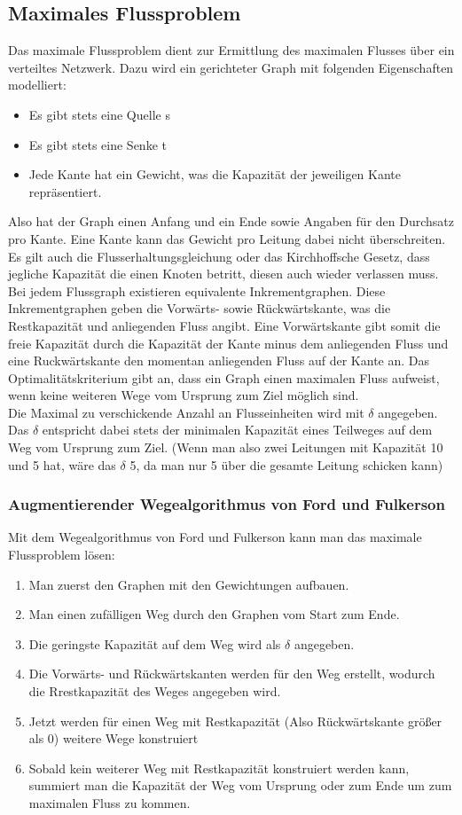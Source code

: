 \documentclass{article}
\begin{document}
	\subsection{Maximales Flussproblem}
	Das maximale Flussproblem dient zur Ermittlung des maximalen Flusses über ein verteiltes Netzwerk. Dazu wird ein gerichteter Graph mit folgenden Eigenschaften modelliert:
	\begin{itemize}
		\item{Es gibt stets eine Quelle s}
		\item{Es gibt stets eine Senke t}
		\item{Jede Kante hat ein Gewicht, was die Kapazität der jeweiligen Kante repräsentiert.}
	\end{itemize}
	Also hat der Graph einen Anfang und ein Ende sowie Angaben für den Durchsatz pro Kante. Eine Kante kann das Gewicht pro Leitung dabei nicht überschreiten. \\
	Es gilt auch die Flusserhaltungsgleichung oder das Kirchhoffsche Gesetz, dass jegliche Kapazität die einen Knoten betritt, diesen auch wieder verlassen muss. \\
	Bei jedem Flussgraph existieren equivalente Inkrementgraphen. Diese Inkrementgraphen geben die Vorwärts- sowie Rückwärtskante, was die Restkapazität und anliegenden Fluss angibt. Eine Vorwärtskante gibt somit die freie Kapazität durch die Kapazität der Kante minus dem anliegenden Fluss und eine Ruckwärtskante den momentan anliegenden Fluss auf der Kante an. Das Optimalitätskriterium gibt an, dass ein Graph einen maximalen Fluss aufweist, wenn keine weiteren Wege vom Ursprung zum Ziel möglich sind. \\
	Die Maximal zu verschickende Anzahl an Flusseinheiten wird mit $\delta$ angegeben. Das $\delta$ entspricht dabei stets der minimalen Kapazität eines Teilweges auf dem Weg vom Ursprung zum Ziel. (Wenn man also zwei Leitungen mit Kapazität 10 und 5 hat, wäre das $\delta$ 5, da man nur 5 über die gesamte Leitung schicken kann)
	\subsubsection{Augmentierender Wegealgorithmus von Ford und Fulkerson}
	Mit dem Wegealgorithmus von Ford und Fulkerson kann man das maximale Flussproblem lösen:
	\begin{enumerate}
		\item{Man zuerst den Graphen mit den Gewichtungen aufbauen.}
		\item{Man einen zufälligen Weg durch den Graphen vom Start zum Ende.}
		\item{Die geringste Kapazität auf dem Weg wird als $\delta$ angegeben.}
		\item{Die Vorwärts- und Rückwärtskanten werden für den Weg erstellt, wodurch die Rrestkapazität des Weges angegeben wird.}
		\item{Jetzt werden für einen Weg mit Restkapazität (Also Rückwärtskante größer als 0) weitere Wege konstruiert}
		\item{Sobald kein weiterer Weg mit Restkapazität konstruiert werden kann, summiert man die Kapazität der Weg vom Ursprung oder zum Ende um zum maximalen Fluss zu kommen.}
	\end{enumerate}
\end{document}
